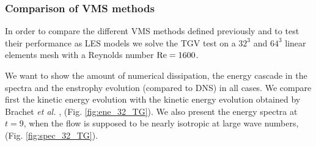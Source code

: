 %

\subsubsection{Comparison of VMS methods}

In order to compare the different VMS methods defined previously and to test their performance as LES models
we solve the TGV test on a $32^3$ and $64^3$ linear elements mesh with a Reynolds number ${\rm Re}=1600$. 

We want to show the amount of numerical dissipation, the energy cascade in the spectra and the enstrophy evolution (compared to DNS) in all cases. We compare first the kinetic energy evolution  with the kinetic energy evolution obtained by Brachet \emph{et al.} \cite{brachet_small-scale_1983}, (Fig. \ref{fig:ene_32_TG}). We also present the energy spectra at $t=9$, when the flow is supposed to be nearly isotropic at large wave numbers, (Fig. \ref{fig:spec_32_TG}).


